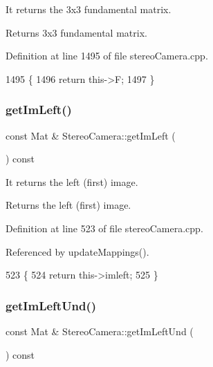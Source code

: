 It returns the 3x3 fundamental matrix. 

\begin{DoxyReturn}{Returns}
3x3 fundamental matrix. 
\end{DoxyReturn}


Definition at line 1495 of file stereo\+Camera.\+cpp.


\begin{DoxyCode}
1495                                               \{
1496     \textcolor{keywordflow}{return} this->F;
1497 \}
\end{DoxyCode}
\mbox{\label{classStereoCamera_ac0cb76a6994bd7ab915cb02d83cf8f8e}} 
\subsubsection{\texorpdfstring{get\+Im\+Left()}{getImLeft()}}
{\footnotesize\ttfamily const Mat \& Stereo\+Camera\+::get\+Im\+Left (\begin{DoxyParamCaption}{ }\end{DoxyParamCaption}) const}



It returns the left (first) image. 

\begin{DoxyReturn}{Returns}
the left (first) image. 
\end{DoxyReturn}


Definition at line 523 of file stereo\+Camera.\+cpp.



Referenced by update\+Mappings().


\begin{DoxyCode}
523                                          \{
524     \textcolor{keywordflow}{return} this->imleft;
525 \}
\end{DoxyCode}
\mbox{\label{classStereoCamera_a52ba4f0331f3690ca0f983b10bd0c783}} 
\subsubsection{\texorpdfstring{get\+Im\+Left\+Und()}{getImLeftUnd()}}
{\footnotesize\ttfamily const Mat \& Stereo\+Camera\+::get\+Im\+Left\+Und (\begin{DoxyParamCaption}{ }\end{DoxyParamCaption}) const}



